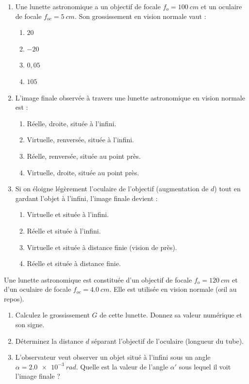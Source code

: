 \documentclass[11pt]{article}
\begin{document}
\begin{exercice}
\begin{enumerate}
    \item Une lunette astronomique a un objectif de focale $f_o = \SI{100}{cm}$ et un oculaire de focale $f_{oc} = \SI{5}{cm}$. Son grossissement en vision normale vaut :
    \begin{enumerate}
        \item $20$
        \item $-20$
        \item $0,05$
        \item $105$
    \end{enumerate}
    \item L'image finale observée à travers une lunette astronomique en vision normale est :
    \begin{enumerate}
        \item Réelle, droite, située à l'infini.
        \item Virtuelle, renversée, située à l'infini.
        \item Réelle, renversée, située au point près.
        \item Virtuelle, droite, située au point près.
    \end{enumerate}
    \item Si on éloigne légèrement l'oculaire de l'objectif (augmentation de $d$) tout en gardant l'objet à l'infini, l'image finale devient :
    \begin{enumerate}
        \item Virtuelle et située à l'infini.
        \item Réelle et située à l'infini.
        \item Virtuelle et située à distance finie (vision de près).
        \item Réelle et située à distance finie.
    \end{enumerate}
\end{enumerate}
\end{exercice}

\begin{exercice}
Une lunette astronomique est constituée d'un objectif de focale $f_o = \SI{120}{cm}$ et d'un oculaire de focale $f_{oc} = \SI{4,0}{cm}$. Elle est utilisée en vision normale (œil au repos).
\begin{enumerate}
    \item Calculez le grossissement $G$ de cette lunette. Donnez sa valeur numérique et son signe.
    \item Déterminez la distance $d$ séparant l'objectif de l'oculaire (longueur du tube).
    \item L'observateur veut observer un objet situé à l'infini sous un angle $\alpha = \SI{2,0e-3}{rad}$. Quelle est la valeur de l'angle $\alpha'$ sous lequel il voit l'image finale ?
\end{enumerate}
\end{exercice}
\end{document}

